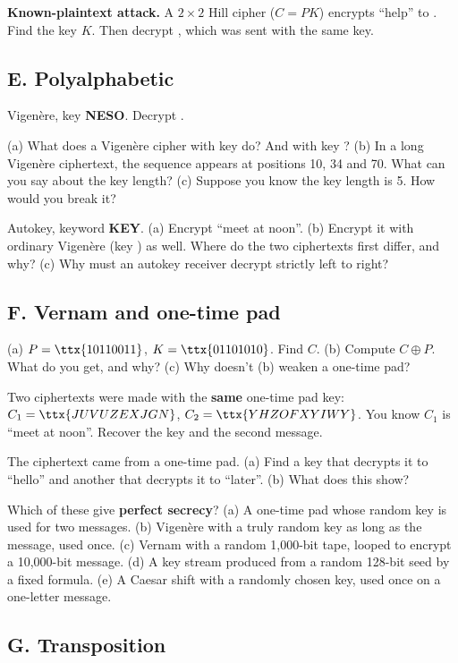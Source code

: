 \q \textbf{Known-plaintext attack.} A $2\times2$ Hill cipher ($C = PK$) encrypts ``help'' to . Find the key $K$. Then decrypt , which was sent with the same key.

\subsection*{E. Polyalphabetic}

\q Vigen\`ere, key \textbf{NESO}. Decrypt .

\q (a) What does a Vigen\`ere cipher with key  do? And with key ?
(b) In a long Vigen\`ere ciphertext, the sequence  appears at positions 10, 34 and 70. What can you say about the key length?
(c) Suppose you know the key length is 5. How would you break it?

\q Autokey, keyword \textbf{KEY}. (a) Encrypt ``meet at noon''.
(b) Encrypt it with ordinary Vigen\`ere (key ) as well. Where do the two ciphertexts first differ, and why?
(c) Why must an autokey receiver decrypt strictly left to right?

\subsection*{F. Vernam and one-time pad}

\q (a) $P = \ttx{10110011}$, $K = \ttx{01101010}$. Find $C$. (b) Compute $C \oplus P$. What do you get, and why? (c) Why doesn't (b) weaken a one-time pad?

\q Two ciphertexts were made with the \textbf{same} one-time pad key:
$C_1 = \ttx{JUVUZEXJGN}$, $C_2 = \ttx{YHZOFXYIWY}$. You know $C_1$ is ``meet at noon''. Recover the key and the second message.

\q The ciphertext  came from a one-time pad. (a) Find a key that decrypts it to ``hello'' and another that decrypts it to ``later''. (b) What does this show?

\q Which of these give \textbf{perfect secrecy}?
(a) A one-time pad whose random key is used for two messages.
(b) Vigen\`ere with a truly random key as long as the message, used once.
(c) Vernam with a random 1,000-bit tape, looped to encrypt a 10,000-bit message.
(d) A key stream produced from a random 128-bit seed by a fixed formula.
(e) A Caesar shift with a randomly chosen key, used once on a one-letter message.

\subsection*{G. Transposition}

